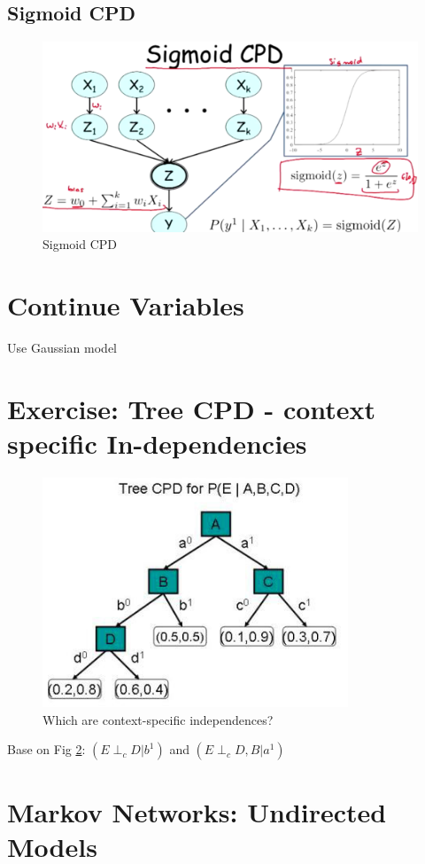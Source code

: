 \documentclass{book}
\begin{document}
\subsection{Sigmoid CPD}

\begin{figure}[h]
\centering
\includegraphics[width=0.7\linewidth]{./figures/sigmoidCPD}
\caption{Sigmoid CPD}
\label{fig:sigmoidCPD}
\end{figure}

\section{Continue Variables}

Use Gaussian model

\section{Exercise: Tree CPD - context specific In-dependencies}
\begin{figure}[h]
\centering
\includegraphics[width=0.7\linewidth]{./figures/treeCPD2}
\caption{Which are context-specific independences?}
\label{fig:treeCPD2}
\end{figure}
Base on Fig \ref{fig:treeCPD2}: $(E \perp_c D | b^1)$ and $(E \perp_c D,B | a^1)$


\section{Markov Networks: Undirected Models}
\end{document}
